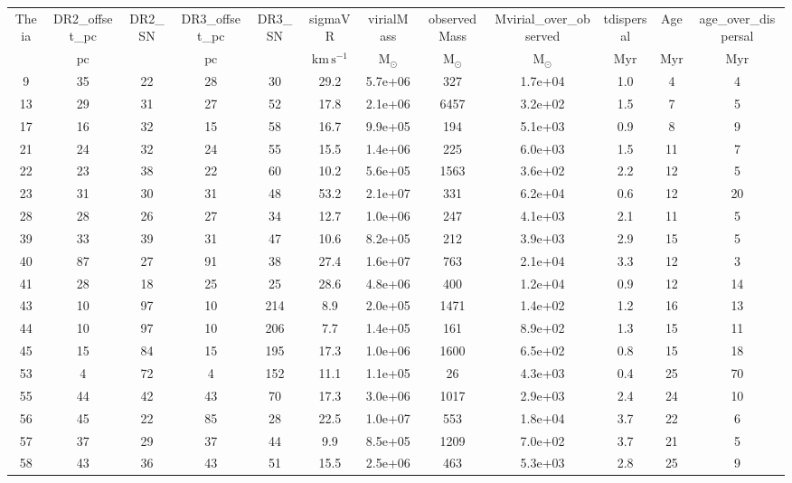 \begin{table}
\begin{tabular}{cccccccccccc}
Theia & DR2_offset_pc & DR2_SN & DR3_offset_pc & DR3_SN & sigmaVR & virialMass & observedMass & Mvirial_over_observed & tdispersal & Age & age_over_dispersal \\
 & $\mathrm{pc}$ &  & $\mathrm{pc}$ &  & $\mathrm{km\,s^{-1}}$ & $\mathrm{M_{\odot}}$ & $\mathrm{M_{\odot}}$ & $\mathrm{M_{\odot}}$ & $\mathrm{Myr}$ & $\mathrm{Myr}$ & $\mathrm{Myr}$ \\
9 & 35 & 22 & 28 & 30 & 29.2 & 5.7e+06 & 327 & 1.7e+04 & 1.0 & 4 & 4 \\
13 & 29 & 31 & 27 & 52 & 17.8 & 2.1e+06 & 6457 & 3.2e+02 & 1.5 & 7 & 5 \\
17 & 16 & 32 & 15 & 58 & 16.7 & 9.9e+05 & 194 & 5.1e+03 & 0.9 & 8 & 9 \\
21 & 24 & 32 & 24 & 55 & 15.5 & 1.4e+06 & 225 & 6.0e+03 & 1.5 & 11 & 7 \\
22 & 23 & 38 & 22 & 60 & 10.2 & 5.6e+05 & 1563 & 3.6e+02 & 2.2 & 12 & 5 \\
23 & 31 & 30 & 31 & 48 & 53.2 & 2.1e+07 & 331 & 6.2e+04 & 0.6 & 12 & 20 \\
28 & 28 & 26 & 27 & 34 & 12.7 & 1.0e+06 & 247 & 4.1e+03 & 2.1 & 11 & 5 \\
39 & 33 & 39 & 31 & 47 & 10.6 & 8.2e+05 & 212 & 3.9e+03 & 2.9 & 15 & 5 \\
40 & 87 & 27 & 91 & 38 & 27.4 & 1.6e+07 & 763 & 2.1e+04 & 3.3 & 12 & 3 \\
41 & 28 & 18 & 25 & 25 & 28.6 & 4.8e+06 & 400 & 1.2e+04 & 0.9 & 12 & 14 \\
43 & 10 & 97 & 10 & 214 & 8.9 & 2.0e+05 & 1471 & 1.4e+02 & 1.2 & 16 & 13 \\
44 & 10 & 97 & 10 & 206 & 7.7 & 1.4e+05 & 161 & 8.9e+02 & 1.3 & 15 & 11 \\
45 & 15 & 84 & 15 & 195 & 17.3 & 1.0e+06 & 1600 & 6.5e+02 & 0.8 & 15 & 18 \\
53 & 4 & 72 & 4 & 152 & 11.1 & 1.1e+05 & 26 & 4.3e+03 & 0.4 & 25 & 70 \\
55 & 44 & 42 & 43 & 70 & 17.3 & 3.0e+06 & 1017 & 2.9e+03 & 2.4 & 24 & 10 \\
56 & 45 & 22 & 85 & 28 & 22.5 & 1.0e+07 & 553 & 1.8e+04 & 3.7 & 22 & 6 \\
57 & 37 & 29 & 37 & 44 & 9.9 & 8.5e+05 & 1209 & 7.0e+02 & 3.7 & 21 & 5 \\
58 & 43 & 36 & 43 & 51 & 15.5 & 2.5e+06 & 463 & 5.3e+03 & 2.8 & 25 & 9 \\

\end{tabular}
\end{table}
